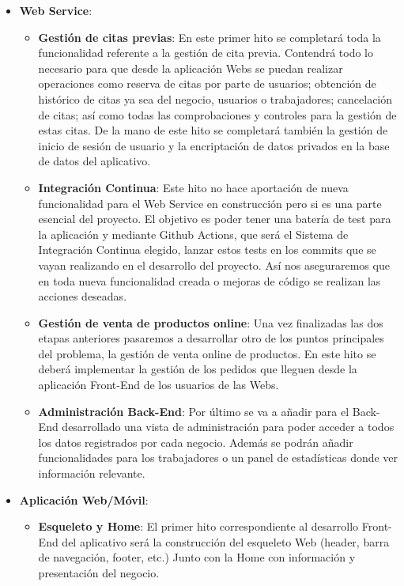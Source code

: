 \vspace{0.5em}
\begin{itemize}
    \item \textbf{Web Service}:
        \begin{itemize}
            \item \textbf{Gestión de citas previas}: En este primer hito se completará toda la funcionalidad referente
            a la gestión de cita previa. Contendrá todo lo necesario para que desde la aplicación Webs se puedan
            realizar operaciones como reserva de citas por parte de usuarios; obtención de histórico de citas ya
            sea del negocio, usuarios o trabajadores; cancelación de citas; así como todas las comprobaciones y
            controles para la gestión de estas citas. De la mano de este hito se completará también la gestión
            de inicio de sesión de usuario y la encriptación de datos privados en la base de datos del aplicativo.

            \item \textbf{Integración Continua}: Este hito no hace aportación de nueva funcionalidad
            para el Web Service en construcción pero si es una parte esencial del proyecto. El objetivo
            es poder tener una batería de test para la aplicación y mediante
            Github Actions, que será el Sistema de Integración Continua elegido, lanzar estos tests en los commits
            que se vayan realizando en el desarrollo del proyecto. Así nos aseguraremos que en toda nueva funcionalidad
            creada o mejoras de código se realizan las acciones deseadas.

            \item \textbf{Gestión de venta de productos online}: Una vez finalizadas las dos etapas anteriores
            pasaremos a desarrollar otro de los puntos principales del problema, la gestión de venta online de
            productos. En este hito se deberá implementar la gestión de los pedidos que lleguen desde la aplicación
            Front-End de los usuarios de las Webs.

            \item \textbf{Administración Back-End}: Por último se va a añadir para el Back-End desarrollado una vista
            de administración para poder acceder a todos los datos registrados por cada negocio. Además se podrán
            añadir funcionalidades para los trabajadores o un panel de estadísticas donde ver información relevante.
        \end{itemize}
    \item \textbf{Aplicación Web/Móvil}:
    \begin{itemize}
                \item \textbf{Esqueleto y Home}: El primer hito correspondiente al desarrollo Front-End del aplicativo
                será la construcción del esqueleto Web (header, barra de navegación, footer, etc.) Junto con la Home
                con información y presentación del negocio.


\end{itemize}
\end{itemize}
